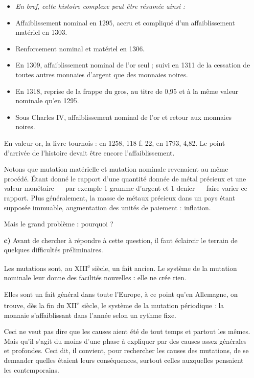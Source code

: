 \documentclass[french,twoside]{book} %
\newlength{\listmod}
\newcommand{\listhead}[1]{\hspace{-1\listmod}\emph{#1}}
\newcommand{\labelchar}[1]{{\color{rubric}\bf #1}}
\begin{document}
\begin{itemize}[itemsep=0pt,]
\item[]\listhead{En bref, cette histoire complexe peut être résumée ainsi :}
\item Affaiblissement nominal en 1295, accru et compliqué d’un affaiblissement matériel en 1303.
\item Renforcement nominal et matériel en 1306.
\item En 1309, affaiblissement nominal de l’or seul ; suivi en 1311 de la cessation de toutes autres monnaies d’argent que des monnaies noires.
\item En 1318, reprise de la frappe du gros, au titre de 0,95 et à la même valeur nominale qu’en 1295.
\item Sous Charles IV, affaiblissement nominal de l’or et retour aux monnaies noires.
\end{itemize}
\noindent En valeur or, la livre tournois : en 1258, 118 f. 22, en 1793, 4,82. Le point d’arrivée de l’histoire devait être encore l’affaiblissement.\par
Notons que mutation matérielle et mutation nominale revenaient au même procédé. Étant donné le rapport d’une quantité donnée de métal précieux et une valeur monétaire — par exemple 1 gramme d’argent et 1 denier — faire varier ce rapport. Plus généralement, la masse de métaux précieux dans un pays étant supposée immuable, augmentation des unités de paiement : inflation.\par
Mais le grand problème : pourquoi ?\par
\labelchar{c)} Avant de chercher à répondre à cette question, il faut éclaircir le terrain de quelques difficultés préliminaires.\par
Les mutations sont, au XIII\textsuperscript{e} siècle, un fait ancien. Le système de la mutation nominale leur donne des facilités nouvelles : elle ne crée rien.\par
Elles sont un fait général dans toute l’Europe, à ce point qu’en Allemagne, on trouve, dès la fin du XII\textsuperscript{e} siècle, le système de la mutation périodique : la monnaie s’affaiblissant dans l’année selon un rythme fixe.\par
Ceci ne veut pas dire que les causes aient été de tout temps et partout les mêmes. Mais qu’il s’agit du moins d’une phase à expliquer par des causes assez générales et profondes. Ceci dit, il convient, pour rechercher les causes des mutations, de se demander quelles étaient leurs conséquences, surtout celles auxquelles pensaient les contemporains.\par
\end{document}
